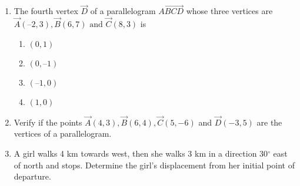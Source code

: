 \begin{enumerate}[label=\thesubsection.\arabic*,ref=\thesubsection.\theenumi]
\item The fourth vertex $\vec{D}$ of a parallelogram $\vec{ABCD}$ whose three vertices are
	$\vec{A} (–2, 3), \vec{B} (6, 7)\text { and } \vec{C} (8, 3)$ is
\begin{enumerate}
	\item $(0, 1)$
	\item $(0, –1)$
	\item $ (–1,0)$
	\item$(1, 0)$
\end{enumerate}
\item Verify if the points $\vec{A}(4,3), \vec{B}(6,4),\vec{C}(5,-6)$  and  $\vec{D}(-3,5)$ are the vertices of a parallelogram.
\item A girl walks 4 km towards west, then she walks 3 km in a direction 30$^{\circ}$ east of north and stops. Determine the girl's displacement from her initial point of departure.\\
	\solution
		
\end{enumerate}
